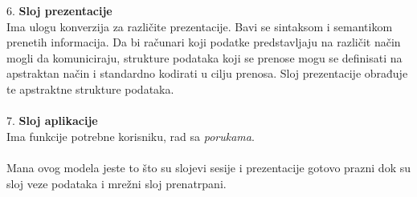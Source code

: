 \documentclass{article} %
\begin{document}
6. \textbf{Sloj prezentacije}\\
Ima ulogu konverzija za različite prezentacije. Bavi se sintaksom i semantikom prenetih informacija. Da bi računari koji podatke predstavljaju na različit način mogli da komuniciraju, strukture podataka koji se prenose mogu se definisati na apstraktan način i standardno kodirati u cilju prenosa. Sloj prezentacije obrađuje te apstraktne strukture podataka.\\\\
7. \textbf{Sloj aplikacije}\\
Ima funkcije potrebne korisniku, rad sa \textit{porukama}.  
\\
\\
Mana ovog modela jeste to što su  slojevi sesije i prezentacije gotovo prazni dok su sloj veze podataka i mrežni sloj prenatrpani.
\end{document}
